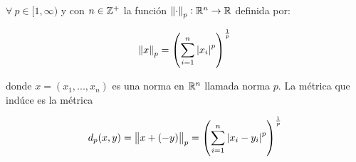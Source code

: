 \begin{theorem} \label{theom2}
    $\forall \: p \in [1,\infty)$ y con $n \in {\ensuremath{\mathbb{Z}}}^{+}$ la función ${\norm{\cdot}}_{p} : \mathbb{R}^n \to \mathbb{R}$ definida por:

    \begin{equation*}
        {\norm{x}}_{p} = {\left( \sum_{i=1}^{n} {\abs{{x}_{i}}}^{p}\right)}^{\frac{1}{p}}
    \end{equation*}

    \noindent donde $x=(x_1,...,x_n)$ es una norma en $\mathbb{R}^n$ llamada norma $p$. La métrica que indúce es la métrica

    \begin{equation*}
        {d}_{p}(x,y) = {\norm{x+(-y)}}_{p} = {\left( \sum_{i=1}^{n} {\abs{{x}_{i}-{y}_{i}}}^{p}\right)}^{\frac{1}{p}}
    \end{equation*}
\end{theorem}

